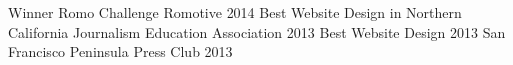 \begin{cvhonors}
  \cvhonor
    {Winner Romo Challenge}
    {Romotive}
    {}
    {2014}
  \cvhonor
    {Best Website Design in Northern California}
    {Journalism Education Association}
    {}
    {2013}
  \cvhonor
    {Best Website Design 2013}
    {San Francisco Peninsula Press Club}
    {}
    {2013}
\end{cvhonors}
